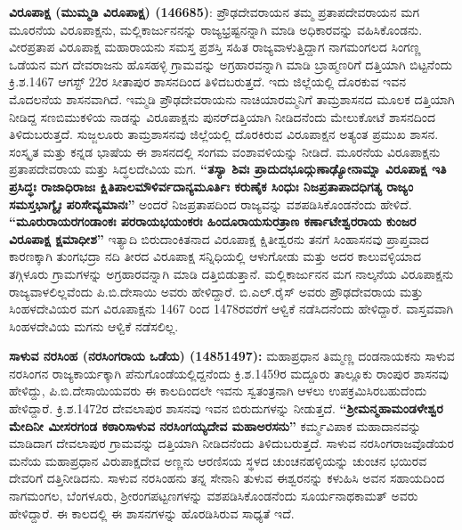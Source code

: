 \textbf{ವಿರೂಪಾಕ್ಷ (ಮುಮ್ಮಡಿ ವಿರೂಪಾಕ್ಷ) (1466\general{\enginline{-}}85)}: ಪ್ರೌಢದೇವರಾಯನ ತಮ್ಮ ಪ್ರತಾಪದೇವರಾಯನ ಮಗ ಮೂರನೆಯ ವಿರೂಪಾಕ್ಷನು, ಮಲ್ಲಿಕಾರ್ಜುನನನ್ನು ರಾಜ್ಯಭ್ರಷ್ಟನನ್ನಾಗಿ ಮಾಡಿ ಅಧಿಕಾರವನ್ನು ವಹಿಸಿಕೊಂಡನು. ವೀರಪ್ರತಾಪ ವಿರೂಪಾಕ್ಷ ಮಹಾರಾಯನು ಸಮಸ್ತ ಪ್ರಶಸ್ತಿ ಸಹಿತ ರಾಜ್ಯವಾಳುತ್ತಿದ್ದಾಗ ನಾಗಮಂಗಲದ ಸಿಂಗಣ್ಣ ಒಡೆಯನ ಮಗ ದೇವರಾಜನು ಹೊಸಹಳ್ಳಿ ಗ್ರಾಮವನ್ನು ಅಗ್ರಹಾರವನ್ನಾಗಿ ಮಾಡಿ ಬ್ರಾಹ್ಮಣರಿಗೆ ದತ್ತಿಯಾಗಿ ಬಿಟ್ಟನೆಂದು ಕ್ರಿ.ಶ.1467 ಆಗಸ್ಟ್​ 22ರ ಸೀತಾಪುರ ಶಾಸನದಿಂದ ತಿಳಿದಬರುತ್ತದೆ. ಇದು ಜಿಲ್ಲೆಯಲ್ಲಿ ದೊರಕುವ ಇವನ ಮೊದಲನೆಯ ಶಾಸನವಾಗಿದೆ. ಇಮ್ಮಡಿ ಪ್ರೌಢದೇವರಾಯನು ನಾಚಿಯಾರಮ್ಮನಿಗೆ ತಾಮ್ರಶಾಸನದ ಮೂಲಕ ದತ್ತಿಯಾಗಿ ನೀಡಿದ್ದ ಸಣಬಿಮುಕಳಿಯ ನಾಡನ್ನು ವಿರೂಪಾಕ್ಷನು ಪುನರ್​ದತ್ತಿಯಾಗಿ ನೀಡಿದನೆಂದು ಮೇಲುಕೋಟೆ ಶಾಸನದಿಂದ ತಿಳಿದುಬರುತ್ತದೆ. ಸುಜ್ಜಲೂರು ತಾಮ್ರಶಾಸನವು ಜಿಲ್ಲೆಯಲ್ಲಿ ದೊರಕಿರುವ ವಿರೂಪಾಕ್ಷನ ಅತ್ಯಂತ ಪ್ರಮುಖ ಶಾಸನ. ಸಂಸ್ಕೃತ ಮತ್ತು ಕನ್ನಡ ಭಾಷೆಯ ಈ ಶಾಸನದಲ್ಲಿ ಸಂಗಮ ವಂಶಾವಳಿಯನ್ನು ನೀಡಿದೆ. ಮೂರನೆಯ ವಿರೂಪಾಕ್ಷನು ಪ್ರತಾಪದೇವರಾಯ ಮತ್ತು ಸಿದ್ಧಲದೇವಿಯ ಮಗ. \textbf{“ತಸ್ಯಾ ಶಿವಃ ಪ್ರಾದುದಭೂದ್ಗುಣಾಢ್ಯೋನಾಮ್ನಾ ವಿರೂಪಾಕ್ಷ ಇತಿ ಪ್ರಸಿದ್ಧಃ ರಾಜಾಧಿರಾಜಃ ಕ್ಷಿತಿಪಾಲಮೌಳಿರ್ವದಾನ್ಯ\-ಮೂರ್ತಿಃ ಕರುಣೈಕ ಸಿಂಧುಃ ನಿಜಪ್ರತಾಪಾದಧಿಗತ್ಯ ರಾಜ್ಯಂ ಸಮಸ್ತಭಾಗ್ಯೈಃ ಪರಿಸೇವ್ಯಮಾನಃ”} ಅಂದರೆ ನಿಜಪ್ರತಾಪದಿಂದ ರಾಜ್ಯವನ್ನು ವಶಪಡಿಸಿಕೊಂಡನೆಂದು ಹೇಳಿದೆ. \textbf{“ಮೂರುರಾಯರಗಂಡಾಂಕಃ ಪರರಾಯಭಯಂಕರಃ ಹಿಂದೂರಾಯಸುರತ್ರಾಣ ಕರ್ಣಾಟೇಶ್ವರರಾಯ ಕುಂಜರ ವಿರೂಪಾಕ್ಷ ಕ್ಷಮಾಧೀಶ”} ಇತ್ಯಾದಿ ಬಿರುದಾಂಕಿತನಾದ ವಿರೂಪಾಕ್ಷ ಕ್ಷಿತೀಶ್ವರನು ತನಗೆ ಸಿಂಹಾಸನವು ಪ್ರಾಪ್ತವಾದ ಕಾರಣಕ್ಕಾಗಿ ತುಂಗಭದ್ರಾ ನದಿ ತೀರದ ವಿರೂಪಾಕ್ಷ ಸನ್ನಿಧಿಯಲ್ಲಿ ಆಳುಗೋಡು ಮತ್ತು ಅದರ ಕಾಲುವಳ್ಳಿಯಾದ ತಗ್ಗಿಳೂರು ಗ್ರಾಮಗಳನ್ನು ಅಗ್ರಹಾರವನ್ನಾಗಿ ಮಾಡಿ ದತ್ತಿಬಿಡುತ್ತಾನೆ. ಮಲ್ಲಿಕಾರ್ಜುನನ ಮಗ ನಾಲ್ಕನೆಯ ವಿರೂಪಾಕ್ಷನು ರಾಜ್ಯವಾಳಲಿಲ್ಲವೆಂದು ಪಿ.ಬಿ.ದೇಸಾಯಿ ಅವರು ಹೇಳಿದ್ದಾರೆ. ಬಿ.ಎಲ್​.ರೈಸ್​ ಅವರು ಪ್ರೌಢದೇವರಾಯ ಮತ್ತು ಸಿಂಹಳದೇವಿಯರ ಮಗ ವಿರೂಪಾಕ್ಷನು 1467 ರಿಂದ 1478ರವರೆಗೆ ಆಳ್ವಿಕೆ ನಡೆಸಿದನೆಂದು ಹೇಳಿದ್ದಾರೆ. ವಾಸ್ತವವಾಗಿ ಸಿಂಹಳದೇವಿಯ ಮಗನು ಆಳ್ವಿಕೆ ನಡೆಸಲಿಲ್ಲ.

\textbf{ಸಾಳುವ ನರಸಿಂಹ (ನರಸಿಂಗರಾಯ ಒಡೆಯ) (1485\general{\enginline{-}}1497):} ಮಹಾಪ್ರಧಾನ ತಿಮ್ಮಣ್ಣ ದಂಡನಾಯಕನು ಸಾಳುವ ನರಸಿಂಗನ ರಾಜ್ಯಕಾರ್ಯಕ್ಕಾಗಿ ಪೆನುಗೊಂಡೆಯಲ್ಲಿದ್ದನೆಂದು ಕ್ರಿ.ಶ.1459ರ ಮದ್ದೂರು ತಾಲ್ಲೂಕು ರಾಂಪುರ ಶಾಸನವು ಹೇಳಿದ್ದು, ಪಿ.ಬಿ.ದೇಸಾಯಿಯವರು ಈ ಕಾಲದಿಂದಲೇ ಇವನು ಸ್ವತಂತ್ರನಾಗಿ ಆಳಲು ಉಪಕ್ರಮಿಸಿರಬಹುದೆಂದು ಹೇಳಿದ್ದಾರೆ. ಕ್ರಿ.ಶ.1472ರ ದೇವಲಾಪುರ ಶಾಸನವು ಇವನ ಬಿರುದುಗಳನ್ನು ನೀಡುತ್ತದೆ. \textbf{“ಶ‍್ರೀಮನ್ಮಹಾಮಂಡಳೇಶ್ವರ ಮೇದಿನೀ ಮೀಸರಗಂಡ ಕಠಾರಿಸಾಳುವ ನರಸಿಂಗಯ್ಯದೇವ ಮಹಾಅರಸನು”} ಕರ್ಮ್ಮವಿಪಾಕ ಮಹಾದಾನವನ್ನು ಮಾಡಿದಾಗ ದೇವಲಾಪುರ ಗ್ರಾಮವನ್ನು ದತ್ತಿಯಾಗಿ ನೀಡಿದನೆಂದು ತಿಳಿದುಬರುತ್ತದೆ. ಸಾಳುವ ನರಸಿಂಗರಾಜವೊಡೆಯರ ಮನೆಯ ಮಹಾಪ್ರಧಾನ ವಿರುಪಾಕ್ಷದೇವ ಅಣ್ಣನು ಆರಣಿಸಯ ಸ್ಥಳದ ಚುಂಚನಹಳ್ಳಿಯನ್ನು ಚುಂಚನ ಭಯಿರವ ದೇವರಿಗೆ ದತ್ತಿ\break ನೀಡಿದನು. ಸಾಳುವ ನರಸಿಂಹನು ತನ್ನ ಸೇನಾನಿ ತುಳುವ ಈಶ್ವರನನ್ನು ಕಳುಹಿಸಿ ಅವನ ಸಹಾಯದಿಂದ ನಾಗಮಂಗಲ, ಬೆಂಗಳೂರು, ಶ‍್ರೀರಂಗಪಟ್ಟಣಗಳನ್ನು ವಶಪಡಿಸಿಕೊಂಡನೆಂದು ಸೂರ್ಯನಾಥಕಾಮತ್​ ಅವರು ಹೇಳಿದ್ದಾರೆ. ಈ ಕಾಲದಲ್ಲಿ ಈ ಶಾಸನಗಳನ್ನು ಹೊರಡಿಸಿರುವ ಸಾಧ್ಯತೆ ಇದೆ.

